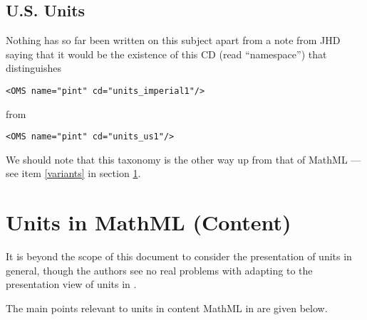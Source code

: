 \documentclass[11pt]{openmathTN}
\begin{document}
\subsection{U.S. Units}
Nothing has so far been written on this subject apart from a note from JHD
saying that it would be the existence of this CD (read ``namespace'') that
distinguishes
\begin{verbatim}
<OMS name="pint" cd="units_imperial1"/>
\end{verbatim}
from
\begin{verbatim}
<OMS name="pint" cd="units_us1"/>
\end{verbatim}
We should note that this taxonomy is the other way up from that of MathML
--- see item \ref{variants} in section \ref{MathMLsect}.
\section{Units in MathML (Content)}\label{MathMLsect}
It is beyond the scope of this document to consider the presentation of
units in general, though the authors see no real problems with adapting to
the presentation view of units in \cite{WorldWideWebConsortium2003}.
\par
The main points relevant to units in content MathML in
\cite{WorldWideWebConsortium2003} are given below.
\end{document}
